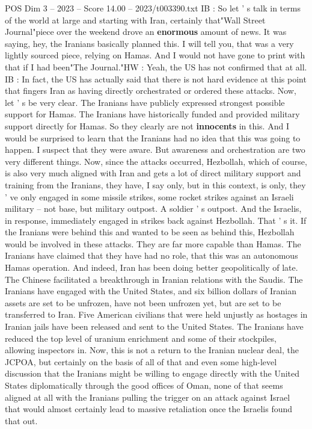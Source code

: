 \begin{textsample}{POS Dim 3 – 2023 – Score 14.00 – 2023/t003390.txt}
IB : So let ' s talk in terms of the world at large and starting with Iran, certainly that"Wall Street Journal"piece over the weekend drove an \textbf{enormous} amount of news.
It was saying, hey, the Iranians basically planned this.
I will tell you, that was a very lightly sourced piece, relying on Hamas.
And I would not have gone to print with that if I had been"The Journal."HW : Yeah, the US has not confirmed that at all.
IB : In fact, the US has actually said that there is not hard evidence at this point that fingers Iran as having directly orchestrated or ordered these attacks.
Now, let ' s be very clear.
The Iranians have publicly expressed strongest possible support for Hamas.
The Iranians have historically funded and provided military support directly for Hamas.
So they clearly are not \textbf{innocents} in this.
And I would be surprised to learn that the Iranians had no idea that this was going to happen.
I suspect that they were aware.
But awareness and orchestration are two very different things.
Now, since the attacks occurred, Hezbollah, which of course, is also very much aligned with Iran and gets a lot of direct military support and training from the Iranians, they have, I say only, but in this context, is only, they ' ve only engaged in some missile strikes, some rocket strikes against an Israeli military -- not base, but military outpost.
A soldier ' s outpost.
And the Israelis, in response, immediately engaged in strikes back against Hezbollah.
That ' s it.
If the Iranians were behind this and wanted to be seen as behind this, Hezbollah would be involved in these attacks.
They are far more capable than Hamas.
The Iranians have claimed that they have had no role, that this was an autonomous Hamas operation.
And indeed, Iran has been doing better geopolitically of late.
The Chinese facilitated a breakthrough in Iranian relations with the Saudis.
The Iranians have engaged with the United States, and six billion dollars of Iranian assets are set to be unfrozen, have not been unfrozen yet, but are set to be transferred to Iran.
Five American civilians that were held unjustly as hostages in Iranian jails have been released and sent to the United States.
The Iranians have reduced the top level of uranium enrichment and some of their stockpiles, allowing inspectors in.
Now, this is not a return to the Iranian nuclear deal, the JCPOA, but certainly on the basis of all of that and even some high-level discussion that the Iranians might be willing to engage directly with the United States diplomatically through the good offices of Oman, none of that seems aligned at all with the Iranians pulling the trigger on an attack against Israel that would almost certainly lead to massive retaliation once the Israelis found that out.

\end{textsample}
